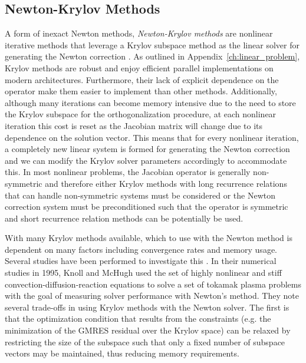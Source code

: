 \subsection{Newton-Krylov Methods\ }
\label{subsec:newton_krylov_methods}
A form of inexact Newton methods, \textit{Newton-Krylov methods} are
nonlinear iterative methods that leverage a Krylov subspace method as
the linear solver for generating the Newton correction
\citep{kelley_iterative_1995}. As outlined in
Appendix~\ref{ch:linear_problem}, Krylov methods are robust and enjoy
efficient parallel implementations on modern
architectures. Furthermore, their lack of explicit dependence on the
operator make them easier to implement than other
methods. Additionally, although many iterations can become memory
intensive due to the need to store the Krylov subspace for the
orthogonalization procedure, at each nonlinear iteration this cost is
reset as the Jacobian matrix will change due to its dependence on the
solution vector. This means that for every nonlinear iteration, a
completely new linear system is formed for generating the Newton
correction and we can modify the Krylov solver parameters accordingly
to accommodate this. In most nonlinear problems, the Jacobian operator
is generally non-symmetric and therefore either Krylov methods with
long recurrence relations that can handle non-symmetric systems must
be considered or the Newton correction system must be preconditioned
such that the operator is symmetric and short recurrence relation
methods can be potentially be used.

With many Krylov methods available, which to use with the Newton
method is dependent on many factors including convergence rates and
memory usage. Several studies have been performed to investigate this
\citep{mchugh_inexact_1993,knoll_newton-krylov_1995}. In their
numerical studies in 1995, Knoll and McHugh used the set of highly
nonlinear and stiff convection-diffusion-reaction equations to solve a
set of tokamak plasma problems with the goal of measuring solver
performance with Newton's method. They note several trade-offs in
using Krylov methods with the Newton solver. The first is that the
optimization condition that results from the constraints (e.g. the
minimization of the GMRES residual over the Krylov space) can be
relaxed by restricting the size of the subspace such that only a fixed
number of subspace vectors may be maintained, thus reducing memory
requirements. 

